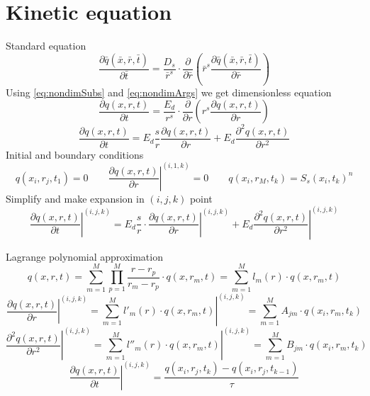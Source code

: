 \documentclass[12pt]{article}
\begin{document}
\section{Kinetic equation}
Standard equation
\begin{equation}
\dfrac{\partial \bar{q}(\bar{x},\bar{r},\bar{t})}{\partial \bar{t}}=\dfrac{D_s}{\bar{r}^s}\cdot\dfrac{\partial }{\partial \bar{r}}\left(\bar{r}^s\dfrac{\partial \bar{q}(\bar{x},\bar{r},\bar{t})}{\partial \bar{r}}\right)
\end{equation}
Using \eqref{eq:nondimSubs} and  \eqref{eq:nondimArgs} we get dimensionless equation
\begin{equation}
\dfrac{\partial q(x,r,t)}{\partial t}=\dfrac{E_d}{r^s}\cdot\dfrac{\partial }{\partial r}\left(r^s\dfrac{\partial q(x,r,t)}{\partial r}\right)
\end{equation}
\begin{equation}
\dfrac{\partial q(x,r,t)}{\partial t}=E_d\dfrac{s}{r}\dfrac{\partial q(x,r,t)}{\partial r}  +E_d\dfrac{\partial^2q(x,r,t) }{\partial r^2}
\end{equation}
Initial and boundary conditions
\begin{equation}\label{eq:kineticB}
q(x_i, r_j, t_1) = 0
\qquad
\left.\dfrac{\partial q(x,r,t)}{\partial r}\right\vert^{(i, 1, k)}=0 
\qquad
q(x_i, r_M, t_k) = S_s(x_i, t_k)^n
\end{equation}
\indent Simplify and make expansion in $(i, j, k)$ point
\begin{equation}\label{eq:kinetic}
\left.\dfrac{\partial q(x,r,t)}{\partial t}\right\vert^{(i, j, k)}=
	E_d\dfrac{s}{r}\cdot\left.\dfrac{\partial q(x,r,t)}{\partial  r}\right\vert^{(i, j, k)} + E_d \left.\dfrac{\partial^2 q(x,r,t)}{\partial r^2}\right\vert^{(i, j, k)}
\end{equation}

Lagrange polynomial approximation
\begin{equation}
q(x,r,t)=
\sum_{m=1}^M\prod_{p=1}^M \dfrac{r-r_p}{r_m-r_p}\cdot  q(x,r_m,t)=
\sum_{m=1}^Ml_m(r)\cdot  q(x,r_m,t)
\end{equation}
\begin{equation}\label{eq:dqdr}
\left.\dfrac{\partial q(x,r,t)}{\partial r}\right\vert^{(i, j, k)}=
\left.\sum_{m=1}^Ml'_m(r)\cdot  q(x,r_m,t)\right\vert^{(i, j, k)}=
\sum_{m=1}^MA_{jm}\cdot  q(x_i,r_m,t_k)
\end{equation}
\begin{equation}\label{eq:ddqdr2}
\left.\dfrac{\partial^2 q(x,r,t)}{\partial r^2}\right\vert^{(i, j, k)}=
\left.\sum_{m=1}^Ml''_m(r)\cdot  q(x,r_m,t)\right\vert^{(i, j, k)}=
\sum_{m=1}^MB_{jm}\cdot  q(x_i,r_m,t_k)
\end{equation}
\begin{equation}\label{eq:dqdt}
\left.\dfrac{\partial q(x,r,t)}{\partial t}\right\vert^{(i, j, k)}=
\dfrac{q(x_i,r_j,t_{k}) - q(x_i,r_j,t_{k-1})}{\tau}
\end{equation}\\
\end{document}
